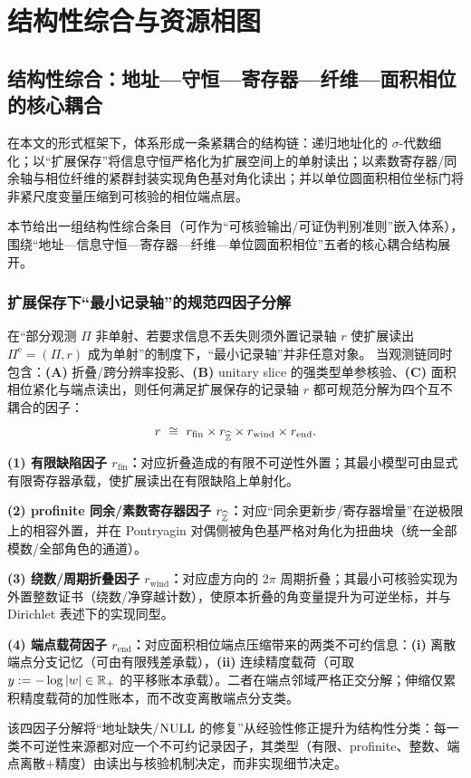 \section{结构性综合与资源相图}\label{app:structural-synthesis-phase-diagram}

\subsection{结构性综合：地址—守恒—寄存器—纤维—面积相位的核心耦合}
在本文的形式框架下，体系形成一条紧耦合的结构链：递归地址化的 $\sigma$-代数细化；以“扩展保存”将信息守恒严格化为扩展空间上的单射读出；以素数寄存器/同余轴与相位纤维的紧群封装实现角色基对角化读出；并以单位圆面积相位坐标门将非紧尺度变量压缩到可核验的相位端点层。
\par
本节给出一组结构性综合条目（可作为“可核验输出/可证伪判别准则”嵌入体系），围绕“地址—信息守恒—寄存器—纤维—单位圆面积相位”五者的核心耦合结构展开。

\subsubsection{扩展保存下“最小记录轴”的规范四因子分解}\label{subsubsec:app28-record-axis-four-factor}
在“部分观测 $\Pi$ 非单射、若要求信息不丢失则须外置记录轴 $r$ 使扩展读出 $\Pi^{\mathrm e}=(\Pi,r)$ 成为单射”的制度下，“最小记录轴”并非任意对象。
当观测链同时包含：\textbf{(A)} 折叠/跨分辨率投影、\textbf{(B)} unitary slice 的强类型单参核验、\textbf{(C)} 面积相位紧化与端点读出，则任何满足扩展保存的记录轴 $r$ 都可规范分解为四个互不耦合的因子：
$$
r\ \cong\ r_{\mathrm{fin}}\times r_{\widehat{\ZZ}}\times r_{\mathrm{wind}}\times r_{\mathrm{end}}.
$$
\par
\noindent\textbf{(1) 有限缺陷因子 $r_{\mathrm{fin}}$：}对应折叠造成的有限不可逆性外置；其最小模型可由显式有限寄存器承载，使扩展读出在有限缺陷上单射化。\par
\noindent\textbf{(2) profinite 同余/素数寄存器因子 $r_{\widehat{\mathbb{Z}}}$：}对应“同余更新步/寄存器增量”在逆极限上的相容外置，并在 Pontryagin 对偶侧被角色基严格对角化为扭曲块（统一全部模数/全部角色的通道）。\par
\noindent\textbf{(3) 绕数/周期折叠因子 $r_{\mathrm{wind}}$：}对应虚方向的 $2\pi$ 周期折叠；其最小可核验实现为外置整数证书（绕数/净穿越计数），使原本折叠的角变量提升为可逆坐标，并与 Dirichlet 表述下的实现同型。\par
\noindent\textbf{(4) 端点载荷因子 $r_{\mathrm{end}}$：}对应面积相位端点压缩带来的两类不可约信息：\textbf{(i)} 离散端点分支记忆（可由有限残差承载），\textbf{(ii)} 连续精度载荷（可取 $y:=-\log|w|\in\mathbb{R}_{+}$ 的平移账本承载）。二者在端点邻域严格正交分解；伸缩仅累积精度载荷的加性账本，而不改变离散端点分支类。
\par
该四因子分解将“地址缺失/$\mathrm{NULL}$ 的修复”从经验性修正提升为结构性分类：每一类不可逆性来源都对应一个不可约记录因子，其类型（有限、profinite、整数、端点离散$+$精度）由读出与核验机制决定，而非实现细节决定。


